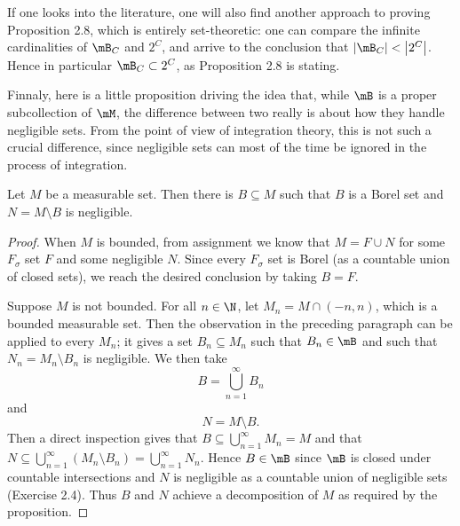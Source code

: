 \documentclass[pmath450]{subfiles}
\begin{document}
    \np If one looks into the literature, one will also find another approach to proving Proposition 2.8, which is entirely set-theoretic: one can compare the infinite cardinalities of $\mB_C$ and $2^C$, and arrive to the conclusion that $\left| \mB_C \right|<\left| 2^C \right|$. Hence in particular $\mB_C\subset 2^C$, as Proposition 2.8 is stating.

    \np Finnaly, here is a little proposition driving the idea that, while $\mB$ is a proper subcollection of $\mM$, the difference between two really is about how they handle negligible sets. From the point of view of integration theory, this is not such a crucial difference, since negligible sets can most of the time be ignored in the process of integration.

    \begin{prop}{}
        Let $M$ be a measurable set. Then there is $B\subseteq M$ such that $B$ is a Borel set and $N=M\setminus B$ is negligible.
    \end{prop}

    \begin{proof}
        When $M$ is bounded, from assignment we know that $M = F\cup N$ for some $F_{\sigma}$ set $F$ and some negligible $N$. Since every $F_{\sigma}$ set is Borel (as a countable union of closed sets), we reach the desired conclusion by taking $B=F$.

        Suppose $M$ is not bounded. For all $n\in\N$, let $M_n=M\cap\left( -n,n \right)$, which is a bounded measurable set. Then the observation in the preceding paragraph can be applied to every $M_n$; it gives a set $B_n\subseteq M_n$ such that $B_n\in\mB$ and such that $N_n=M_n\setminus B_n$ is negligible. We then take
        \begin{equation*}
            B = \bigcup^{\infty}_{n=1}B_n
        \end{equation*}
        and
        \begin{equation*}
            N = M\setminus B.
        \end{equation*}
        Then a direct inspection gives that $B\subseteq\bigcup^{\infty}_{n=1}M_n=M$ and that $N\subseteq\bigcup^{\infty}_{n=1}\left( M_n\setminus B_n \right)=\bigcup^{\infty}_{n=1}N_n$. Hence $B\in\mB$ since $\mB$ is closed under countable intersections and $N$ is negligible as a countable union of negligible sets (Exercise 2.4). Thus $B$ and $N$ achieve a decomposition of $M$ as required by the proposition.
    \end{proof}
\end{document}
